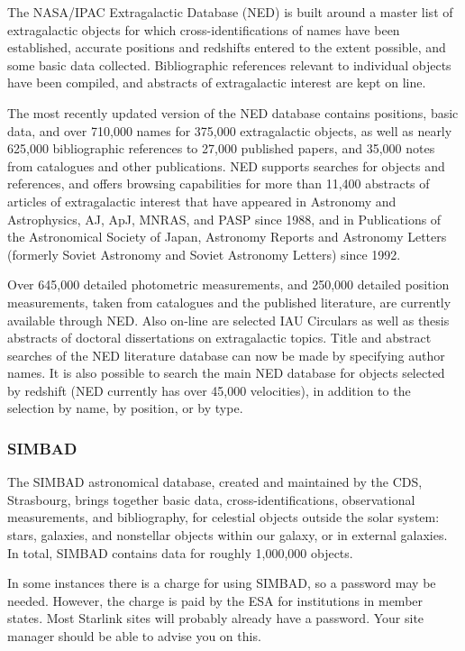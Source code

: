 \documentclass[twoside,11pt]{article}
\newcommand{\htmladdnormallink}[2]{#1}
\newcommand{\xlabel}[1]{}
\newcommand{\STARLINKref}{\htmladdnormallink{Starlink}{http://www.starlink.ac.uk/}}
\newcommand{\SIMBADref}{\htmladdnormallink{SIMBAD}{http://cdsweb.u-strasbg.fr/Simbad.html}}
\newcommand{\NEDref}{\htmladdnormallink{NED}{http://ds.internic.net/cgi-bin/enthtml/database/ned.b}}
\begin{document}
The NASA/IPAC Extragalactic Database ({\NEDref}) is built around a master list of
extragalactic objects for which cross-identifications of names have been
established, accurate positions and redshifts entered to the extent possible,
and some basic data collected. Bibliographic references relevant to
individual objects have been compiled, and abstracts of extragalactic
interest are kept on line.

The most recently updated version of the NED database contains positions,
basic data, and over 710,000 names for 375,000 extragalactic objects, as well
as nearly 625,000 bibliographic references to 27,000 published papers, and
35,000 notes from catalogues and other publications. NED supports searches for
objects and references, and offers browsing capabilities for more than 11,400
abstracts of articles of extragalactic interest that have appeared in
Astronomy and Astrophysics, AJ, ApJ, MNRAS, and PASP since 1988, and in
Publications of the Astronomical Society of Japan, Astronomy Reports and
Astronomy Letters (formerly Soviet Astronomy and Soviet Astronomy Letters)
since 1992.

Over 645,000 detailed photometric measurements, and 250,000 detailed position
measurements, taken from catalogues and the published literature, are currently
available through NED. Also on-line are selected IAU Circulars as well as
thesis abstracts of doctoral dissertations on extragalactic topics. Title and
abstract searches of the NED literature database can now be made by
specifying author names. It is also possible to search the main NED database
for objects selected by redshift ({\NEDref} currently has over 45,000 velocities),
in addition to the selection by name, by position, or by type.

\subsubsection{{\SIMBADref}} \xlabel{SIMBAD}
\label{sec:simbad}

The {\SIMBADref} astronomical database, created and maintained by the CDS,
Strasbourg, brings together basic data, cross-identifications, observational
measurements, and bibliography, for celestial objects outside the solar
system: stars, galaxies, and nonstellar objects within our galaxy, or in
external galaxies. In total, SIMBAD contains data for roughly
1,000,000 objects.

In some instances there is a charge for using SIMBAD, so a password may be needed.
However, the charge is paid by the ESA for institutions in member states. Most
{\STARLINKref} sites will probably already have a password. Your site manager
should be able to advise you on this.
\end{document}
